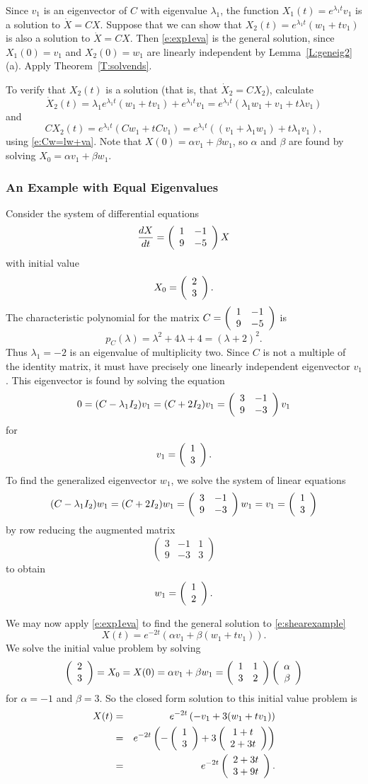 \documentclass{ximera}
\begin{document}
Since $v_1$ is an eigenvector of $C$ with eigenvalue $\lambda_1$, the
function $X_1(t)=e^{\lambda_1 t}v_1$ is a solution to $\dot{X}=CX$.  Suppose
that we can show that $X_2(t)=e^{\lambda_1 t}(w_1+tv_1)$ is also a solution
to $\dot{X}=CX$.  Then \eqref{e:exp1eva} is the general solution, since
$X_1(0)=v_1$ and $X_2(0)=w_1$ are linearly independent by 
Lemma~\ref{L:geneig2}(a).  Apply Theorem~\ref{T:solvends}.

To verify that $X_2(t)$ is a solution (that is, that $\dot{X}_2=CX_2$),
calculate
\[
\dot{X}_2(t) = \lambda_1 e^{\lambda_1 t}(w_1+tv_1) + e^{\lambda_1 t}v_1=
e^{\lambda_1 t}(\lambda_1 w_1 + v_1 +t\lambda v_1)
\]
and
\[
CX_2(t) = e^{\lambda_1 t}(Cw_1+tCv_1) = e^{\lambda_1 t}
((v_1+\lambda_1 w_1)+t\lambda_1 v_1),
\]
using \eqref{e:Cw=lw+va}.  Note that $X(0)=\alpha v_1 + \beta w_1$, so $\alpha$
and $\beta$ are found by solving $X_0= \alpha v_1 + \beta w_1$.

\subsubsection*{An Example with Equal Eigenvalues}

Consider the system of differential equations
\begin{equation}  \label{e:shearexample}
\frac{dX}{dt} = \left(\begin{array}{rr} 1 & -1\\ 9 &-5\end{array}\right) X
\end{equation}
with initial value
\[
X_0 = \left(\begin{array}{r} 2 \\ 3\end{array}\right).
\]
The characteristic polynomial for the matrix $C=\left(\begin{array}{rr} 1 & -1\\ 9 &-5\end{array}\right)$ is
\[
p_C(\lambda) = \lambda^2 + 4\lambda +4 = (\lambda + 2)^2.
\]
Thus $\lambda_1=-2$ is an eigenvalue of multiplicity two.  Since
$C$ is not a multiple of the identity matrix, it must have
precisely one linearly independent eigenvector $v_1$.  This eigenvector is
found by solving the equation
\[
0 = (C-\lambda_1I_2)v_1 = (C+2I_2)v_1 = \left(\begin{array}{rr} 3 & -1\\ 9 &-3\end{array}\right)v_1
\]
for
\[
v_1=\left(\begin{array}{r} 1 \\ 3\end{array}\right).
\]
To find the generalized eigenvector $w_1$, we solve the system of linear
equations
\[
(C-\lambda_1I_2)w_1=(C+2I_2)w_1=\left(\begin{array}{rr} 3 & -1\\ 9 &-3\end{array}\right)w_1= v_1=\left(\begin{array}{r} 1 \\ 3\end{array}\right)
\]
by row reducing the augmented matrix
\[
\left(\begin{array}{rr|r} 3 & -1 & 1\\ 9 & -3 & 3 \end{array}\right)
\]
to obtain
\[
w_1 = \left(\begin{array}{r} 1 \\ 2\end{array}\right).
\]

We may now apply \eqref{e:exp1eva} to find the general solution to
\eqref{e:shearexample}
\[
X(t) = e^{-2t}\left(\alpha v_1 +\beta (w_1+tv_1)\right).
\]
We solve the initial value problem by solving
\[
\left(\begin{array}{r} 2 \\ 3\end{array}\right) = X_0 = X(0) = \alpha v_1 +\beta w_1 =
\left(\begin{array}{rr} 1 & 1\\ 3 &2\end{array}\right)\left(\begin{array}{r} \alpha \\ \beta\end{array}\right)
\]
for $\alpha=-1$ and $\beta=3$.   So the closed form solution to this initial
value problem is
\begin{eqnarray*}
X(t) & = & e^{-2t}\left(-v_1 + 3(w_1+tv_1)\right)\\
& = & e^{-2t}\left(-\left(\begin{array}{r} 1 \\ 3\end{array}\right)+3\left(\begin{array}{c} 1+t \\ 2+3t\end{array}\right)\right)\\
& = & e^{-2t}\left(\begin{array}{r} 2+3t \\ 3+9t\end{array}\right).
\end{eqnarray*}
\end{document}

